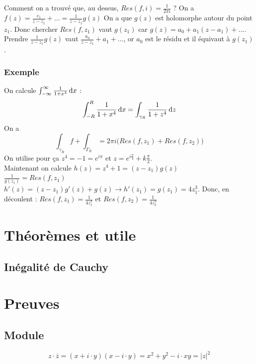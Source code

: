 \documentclass[12pt,a4paper]{article}
\begin{document}
Comment on a trouvé que, au dessus, $Res(f,i) = \frac{1}{2\pi i}$ ?  On a $f(z) = \frac{c_1}{z-z_1} + ... = \frac{1}{z-z_1}g(z)$ On a que $g(z)$ est holomorphe autour du point $z_1$. Donc chercher $Res(f,z_1)$ vaut $g(z_1)$ car $g(z) = a_0 + a_1(z-a_1)+...$. Prendre $\frac{1}{z-z_1}g(z)$ vaut $\frac{a_0}{z-z_1} + a_1 + ...$, or $a_0$ est le résidu et il équivaut à $g(z_1)$.

\subsubsection*{Exemple}
On calcule $\int_{-\infty}^{\infty} \frac{1}{1+x^4}\, \mathrm d x$ :
\[\int_{-R}^{R}\frac{1}{1+x^4} \, \mathrm d x = \int_{\gamma_R}  \frac{1}{1+z^4}\, \mathrm d z\]
On a 
\[\int_{\gamma_R} f + \int_{\Gamma_R} = 2\pi i \big(Res(f,z_1) + Res(f,z_2)\big)\]
On utilise pour ça $z^4 = -1 = e^{i\pi}$ et $z = e^{i\frac{\pi}{4}} + k\frac{\pi}{2}$.\\
Maintenant on calcule $h(z) = z^4 + 1 = (z-z_1)g(z)$\\
$\frac{1}{g(z_1)} = Res(f,z_1)$\\
$h'(z) = (z-z_1) g'(z) + g(z) \to h'(z_1) = g(z_1) = 4z_1^3$. Donc, en découlent : $Res(f,z_1) = \frac{1}{4z_1^3}$ et $Res(f,z_2) = \frac{1}{4z_2^3}$

\newpage
\appendix
\section{Théorèmes et utile}
\setcounter{equation}{0}
\subsection{Inégalité de Cauchy}

\section{Preuves}
\setcounter{equation}{0}
\subsection{Module}
\label{app_preuve: module}
\begin{equation}
	z \cdot \overline{z} = (x + i\cdot y)(x - i\cdot y) = x^2 + y^2 - i\cdot xy = |z|^2
\end{equation}
\end{document}
